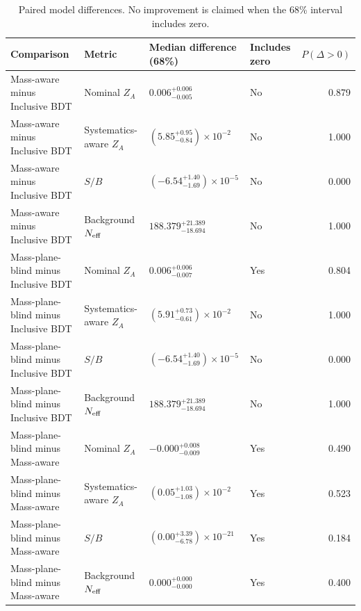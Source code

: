 \begin{table}[tb]
  \centering
  \footnotesize
  \caption{Paired model differences. No improvement is claimed when the 68\% interval includes zero.}
  \label{tab:c7w-paired}
  \begin{tabular}{llllr}
    \toprule
    Comparison & Metric & Median difference (68\%) & Includes zero & $P(\Delta>0)$ \\
    \midrule
    Mass-aware minus Inclusive BDT & Nominal $Z_A$ & $0.006^{+0.006}_{-0.005}$ & No & 0.879 \\
    Mass-aware minus Inclusive BDT & Systematics-aware $Z_A$ & $(5.85^{+0.95}_{-0.84})\times10^{-2}$ & No & 1.000 \\
    Mass-aware minus Inclusive BDT & $S/B$ & $(-6.54^{+1.40}_{-1.69})\times10^{-5}$ & No & 0.000 \\
    Mass-aware minus Inclusive BDT & Background $N_{\rm eff}$ & $188.379^{+21.389}_{-18.694}$ & No & 1.000 \\
    Mass-plane-blind minus Inclusive BDT & Nominal $Z_A$ & $0.006^{+0.006}_{-0.007}$ & Yes & 0.804 \\
    Mass-plane-blind minus Inclusive BDT & Systematics-aware $Z_A$ & $(5.91^{+0.73}_{-0.61})\times10^{-2}$ & No & 1.000 \\
    Mass-plane-blind minus Inclusive BDT & $S/B$ & $(-6.54^{+1.40}_{-1.69})\times10^{-5}$ & No & 0.000 \\
    Mass-plane-blind minus Inclusive BDT & Background $N_{\rm eff}$ & $188.379^{+21.389}_{-18.694}$ & No & 1.000 \\
    Mass-plane-blind minus Mass-aware & Nominal $Z_A$ & $-0.000^{+0.008}_{-0.009}$ & Yes & 0.490 \\
    Mass-plane-blind minus Mass-aware & Systematics-aware $Z_A$ & $(0.05^{+1.03}_{-1.08})\times10^{-2}$ & Yes & 0.523 \\
    Mass-plane-blind minus Mass-aware & $S/B$ & $(0.00^{+3.39}_{-6.78})\times10^{-21}$ & Yes & 0.184 \\
    Mass-plane-blind minus Mass-aware & Background $N_{\rm eff}$ & $0.000^{+0.000}_{-0.000}$ & Yes & 0.400 \\
    \bottomrule
  \end{tabular}
\end{table}
